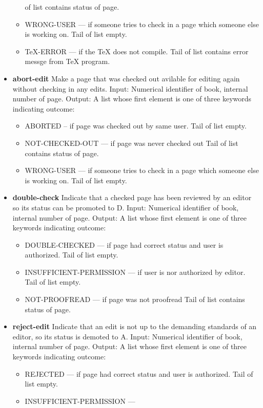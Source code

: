 \begin{itemize}
\begin{itemize}
    of list contains status of page. 
  \item WRONG-USER --- if someone
    tries to check in a page which someone else is working on. Tail of
    list empty. 
  \item TeX-ERROR --- if the TeX does not compile. Tail
    of list contains error messge from TeX program.
  \end{itemize}
\item 
  {\bf abort-edit}  Make a page that was checked out avilable for editing
  again without checking in any edits.  Input: Numerical identifier of
  book, internal number of page.  Output: A list whose first element is
  one of three keywords indicating outcome:
\begin{itemize}
 \item ABORTED -- if page
  was checked out by same user. Tail of list empty. 
\item
  NOT-CHECKED-OUT --- if page was never checked out Tail of list
  contains status of page. 
\item WRONG-USER --- if someone tries to
  check in a page which someone else is working on. Tail of list empty.
\end{itemize}
\item
  {\bf double-check}  Indicate that a checked page has been reviewed by an
  editor so its status can be promoted to D.  Input: Numerical
  identifier of book, internal number of page.  Output: A list whose
  first element is one of three keywords indicating outcome:
  \begin{itemize}
  \item
    DOUBLE-CHECKED --- if page had correct status and user is authorized.
    Tail of list empty. 
  \item INSUFFICIENT-PERMISSION --- if user is
    nor authorized by editor. Tail of list empty. 
  \item NOT-PROOFREAD
    --- if page was not proofread Tail of list contains status of page.
  \end{itemize}
\item
  {\bf reject-edit}  Indicate that an edit is not up to the demanding
  standards of an editor, so its status is demoted to A.  Input:
  Numerical identifier of book, internal number of page.  Output: A
  list whose first element is one of three keywords indicating outcome:
  \begin{itemize}
  \item REJECTED --- if page had correct status and user is
    authorized. Tail of list empty. 
  \item INSUFFICIENT-PERMISSION ---

\end{itemize}
\end{itemize}
